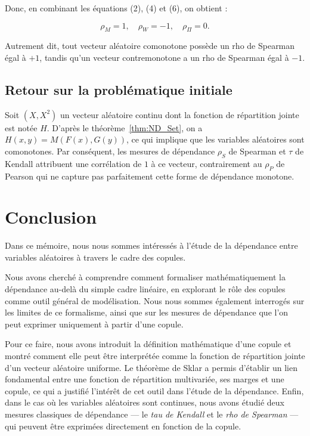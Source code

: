 \documentclass[a4paper,11pt]{amsbook}
\numberwithin{equation}{chapter}
\theoremstyle{definition}
\begin{document}
Donc, en combinant les équations (2), (4) et (6), on obtient :

\[
\rho_M = 1, \quad \rho_W = -1, \quad \rho_{\Pi} = 0.
\]

Autrement dit, tout vecteur aléatoire comonotone possède un rho de Spearman égal à \(+1\), tandis qu’un vecteur contremonotone a un rho de Spearman égal à \(-1\).

\section{Retour sur la problématique initiale}
Soit \((X, X^2)\) un vecteur aléatoire continu dont la fonction de répartition jointe est notée \(H\). D’après le théorème~\ref{thm:ND_Set}, on a \(H(x, y) = M(F(x), G(y))\), ce qui implique que les variables aléatoires sont comonotones. Par conséquent, les mesures de dépendance \(\rho_S\) de Spearman et \(\tau\) de Kendall attribuent une corrélation de \(1\) à ce vecteur, contrairement au \(\rho_P\) de Pearson qui ne capture pas parfaitement cette forme de dépendance monotone.

\newpage

\chapter*{Conclusion}

Dans ce mémoire, nous nous sommes intéressés à l’étude de la dépendance entre variables aléatoires à travers le cadre des copules.

Nous avons cherché à comprendre comment formaliser mathématiquement la dépendance au-delà du simple cadre linéaire, en explorant le rôle des copules comme outil général de modélisation. Nous nous sommes également interrogés sur les limites de ce formalisme, ainsi que sur les mesures de dépendance que l’on peut exprimer uniquement à partir d’une copule.

Pour ce faire, nous avons introduit la définition mathématique d’une copule et montré comment elle peut être interprétée comme la fonction de répartition jointe d’un vecteur aléatoire uniforme. Le théorème de Sklar a permis d'établir un lien fondamental entre une fonction de répartition multivariée, ses marges et une copule, ce qui a justifié l’intérêt de cet outil dans l’étude de la dépendance. Enfin, dans le cas où les variables aléatoires sont continues, nous avons étudié deux mesures classiques de dépendance — le \emph{tau de Kendall} et le \emph{rho de Spearman} — qui peuvent être exprimées directement en fonction de la copule.
\end{document}
